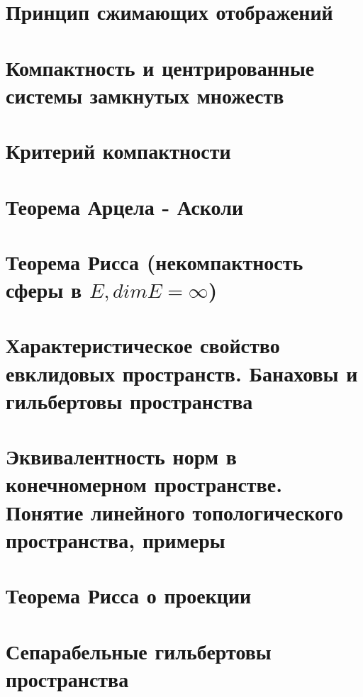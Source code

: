 \section{Принцип сжимающих отображений}


\section{Компактность и центрированные системы замкнутых множеств}


\section{Критерий компактности}


\section{Теорема Арцела - Асколи}


\section{Теорема Рисса (некомпактность сферы в $E, dim E = \infty$)}


\section{Характеристическое свойство евклидовых пространств. Банаховы и гильбертовы пространства}


\section{Эквивалентность норм в конечномерном пространстве. Понятие линейного топологического пространства, примеры}


\section{Теорема Рисса о проекции}


\section{Сепарабельные гильбертовы пространства}


